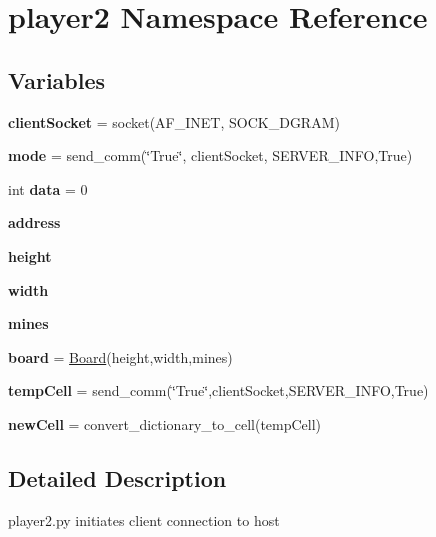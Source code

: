 \hypertarget{namespaceplayer2}{}\section{player2 Namespace Reference}
\label{namespaceplayer2}
\subsection*{Variables}
\begin{DoxyCompactItemize}
\item 
\mbox{\label{namespaceplayer2_ae5f64fc8f7b0b98b23d8ea60c1c6deaa}} 
{\bfseries client\+Socket} = socket(A\+F\+\_\+\+I\+N\+ET, S\+O\+C\+K\+\_\+\+D\+G\+R\+AM)
\item 
\mbox{\label{namespaceplayer2_ad5d3b4c917dd3f13de162bc446fc95ac}} 
{\bfseries mode} = send\+\_\+comm(\char`\"{}True\char`\"{}, client\+Socket, S\+E\+R\+V\+E\+R\+\_\+\+I\+N\+FO,True)
\item 
\mbox{\label{namespaceplayer2_a70135f2d915e69537aacd2ecca420a9e}} 
int {\bfseries data} = 0
\item 
\mbox{\label{namespaceplayer2_adb60efd98bad791213c17bc6602c7fec}} 
{\bfseries address}
\item 
\mbox{\label{namespaceplayer2_a2cf61b54bed5824e48868c19315ea58c}} 
{\bfseries height}
\item 
\mbox{\label{namespaceplayer2_ae56b0f965a4c5af6e38a7a547c03447c}} 
{\bfseries width}
\item 
\mbox{\label{namespaceplayer2_a93741307f314f9eb09e964944e05e728}} 
{\bfseries mines}
\item 
\mbox{\label{namespaceplayer2_ad170142e87f5109fa10893b3863dae6a}} 
{\bfseries board} = \hyperlink{class_board_1_1_board}{Board}(height,width,mines)
\item 
\mbox{\label{namespaceplayer2_ae13161ccd361fd36c6cbd757f33d639b}} 
{\bfseries temp\+Cell} = send\+\_\+comm(\char`\"{}True\char`\"{},client\+Socket,S\+E\+R\+V\+E\+R\+\_\+\+I\+N\+FO,True)
\item 
\mbox{\label{namespaceplayer2_a025745245d0584f1418eb0898b79057a}} 
{\bfseries new\+Cell} = convert\+\_\+dictionary\+\_\+to\+\_\+cell(temp\+Cell)
\end{DoxyCompactItemize}


\subsection{Detailed Description}
\begin{DoxyVerb}player2.py
initiates client connection to host
\end{DoxyVerb}
 